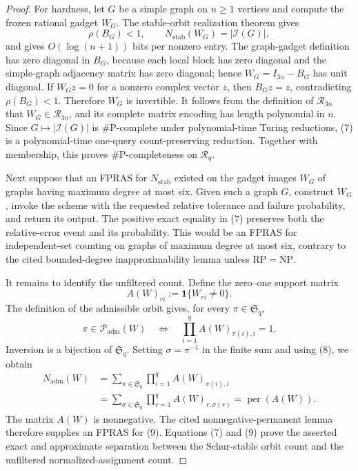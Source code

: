 \documentclass{article}
\begin{document}
\begin{proof}
For hardness, let \(G\) be a simple graph on \(n\geq1\) vertices and compute the frozen rational gadget \(W_G\). The stable-orbit realization theorem gives
\[
 \rho(B_G)<1,
 \qquad
 N_{\mathrm{stab}}(W_G)=|\mathcal I(G)|, \tag{7}
\]
and gives \(O(\log(n+1))\) bits per nonzero entry. The graph-gadget definition has zero diagonal in \(B_G\), because each local block has zero diagonal and the simple-graph adjacency matrix has zero diagonal; hence \(W_G=I_{3n}-B_G\) has unit diagonal. If \(W_Gz=0\) for a nonzero complex vector \(z\), then \(B_Gz=z\), contradicting \(\rho(B_G)<1\). Therefore \(W_G\) is invertible. It follows from the definition of \(\mathcal R_{3n}\) that \(W_G\in\mathcal R_{3n}\), and its complete matrix encoding has length polynomial in \(n\). Since \(G\mapsto|\mathcal I(G)|\) is \(\#\mathrm P\)-complete under polynomial-time Turing reductions, (7) is a polynomial-time one-query count-preserving reduction. Together with membership, this proves \(\#\mathrm P\)-completeness on \(\mathcal R_q\).

Next suppose that an FPRAS for \(N_{\mathrm{stab}}\) existed on the gadget images \(W_G\) of graphs having maximum degree at most six. Given such a graph \(G\), construct \(W_G\), invoke the scheme with the requested relative tolerance and failure probability, and return its output. The positive exact equality in (7) preserves both the relative-error event and its probability. This would be an FPRAS for independent-set counting on graphs of maximum degree at most six, contrary to the cited bounded-degree inapproximability lemma unless \(\mathrm{RP}=\mathrm{NP}\).

It remains to identify the unfiltered count. Define the zero--one support matrix
\[
 A(W)_{ri}:=\mathbf 1\{W_{ri}\neq0\}.
\]
The definition of the admissible orbit gives, for every \(\pi\in\mathfrak S_q\),
\[
 \pi\in\mathcal P_{\mathrm{adm}}(W)
 \quad\Longleftrightarrow\quad
 \prod_{i=1}^q A(W)_{\pi(i),i}=1. \tag{8}
\]
Inversion is a bijection of \(\mathfrak S_q\). Setting \(\sigma=\pi^{-1}\) in the finite sum and using (8), we obtain
\[
\begin{aligned}
 N_{\mathrm{adm}}(W)
 &=\sum_{\pi\in\mathfrak S_q}
   \prod_{i=1}^q A(W)_{\pi(i),i}\\
 &=\sum_{\sigma\in\mathfrak S_q}
   \prod_{r=1}^q A(W)_{r,\sigma(r)}
 =\operatorname{per}(A(W)).
\end{aligned} \tag{9}
\]
The matrix \(A(W)\) is nonnegative. The cited nonnegative-permanent lemma therefore supplies an FPRAS for (9). Equations (7) and (9) prove the asserted exact and approximate separation between the Schur-stable orbit count and the unfiltered normalized-assignment count.
\end{proof}
\end{document}
